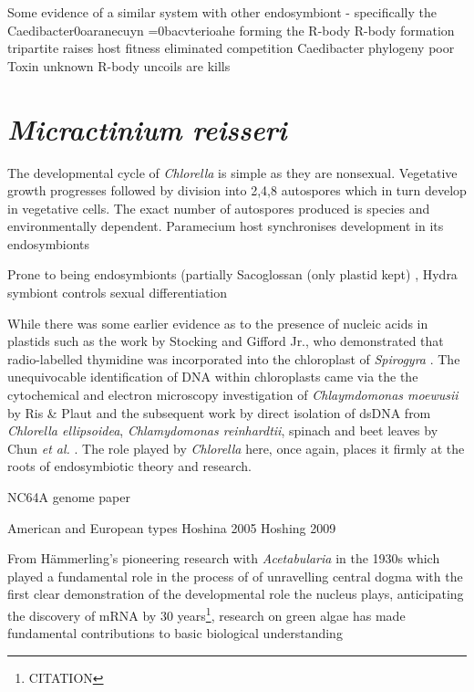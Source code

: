 Some evidence of a similar system with other endosymbiont - specifically the Caedibacter0oaranecuyn =0bacvterioahe
forming the R-body
R-body formation tripartite raises host fitness eliminated competition Caedibacter phylogeny poor Toxin unknown
R-body uncoils are kills  \citep{Schrallhammer2009}




\section{\textit{Micractinium reisseri}}



The developmental cycle of \textit{Chlorella} is simple as they are nonsexual.
Vegetative growth progresses followed by division into 2,4,8 autospores which in turn
develop in vegetative cells.
The exact number of autospores produced is species and environmentally dependent. 
Paramecium host synchronises development in its endosymbionts \citep{Weis1977}


Prone to being endosymbionts (partially Sacoglossan (only plastid kept) \citep{Christa2014},
Hydra symbiont controls sexual differentiation \citep{Bosch2012}

While there was some earlier evidence as to the presence of nucleic acids in 
plastids such as the work by Stocking and Gifford Jr., who demonstrated that
radio-labelled thymidine was incorporated into the chloroplast of \textit{Spirogyra}
\citep{Stocking1959}.
The unequivocable identification of DNA within chloroplasts came via the 
the cytochemical and electron microscopy investigation of \textit{Chlaymdomonas moewusii} 
by Ris \& Plaut \citep{Ris1962} and the subsequent work by direct isolation of
dsDNA from \textit{Chlorella ellipsoidea}, \textit{Chlamydomonas reinhardtii}, spinach
and beet leaves by Chun \textit{et al.} \citep{Chun1963}. The role played by
\textit{Chlorella} here, once again, places it firmly at the roots of endosymbiotic
theory and research.


NC64A genome paper

American and European types Hoshina 2005
Hoshing 2009


From H\"ammerling's pioneering research with \textit{Acetabularia} in the 1930s 
which played a fundamental role in the process of 
of unravelling central dogma with the first clear demonstration of the 
developmental role the nucleus plays, anticipating the discovery of mRNA by 30 years\footnote{CITATION}, research on green algae has made fundamental contributions
to basic biological understanding

